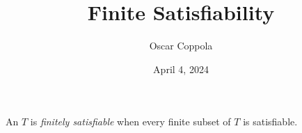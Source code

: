 \documentclass[a4paper]{article}
\title{Finite Satisfiability}
\date{April 4, 2024}
\author{Oscar Coppola}
\begin{document}
\maketitle
\par{
    An  \(T\) is \emph{finitely satisfiable} when every finite subset of \(T\) is satisfiable.
}
\printbibliography
\end{document}
